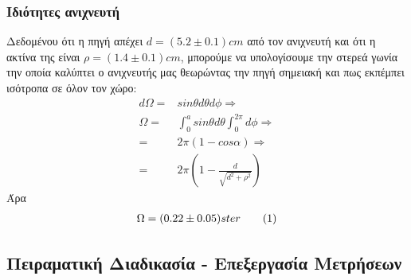\documentclass[a4paper]{article}
\newcommand\numberthis{\addtocounter{equation}{1}\tag{\theequation}}
\begin{document}
	\subsubsection*{Ιδιότητες ανιχνευτή}
	Δεδομένου ότι η πηγή απέχει $d=(5.2\pm 0.1) cm$ από τον ανιχνευτή και ότι η ακτίνα της είναι $\rho = (1.4\pm 0.1)cm$, μπορούμε να υπολογίσουμε την στερεά γωνία την οποία καλύπτει ο ανιχνευτής μας θεωρώντας την πηγή σημειακή και πως εκπέμπει ισότροπα σε όλον τον χώρο: 
		\begin{align*}
			d\Omega =& sin\theta d\theta d\phi \Rightarrow\\
			\Omega  =& \int_0^a  sin\theta d\theta \int_0^{2\pi} d\phi \Rightarrow\\
			        =& 2\pi (1-cos\alpha) \Rightarrow\\
			        =& 2\pi \left(1-\frac{d}{\sqrt{d^2+\rho^2}}\right)
		\end{align*}		 
 		Άρα \footnotemark
 		\vspace{-0.7cm}
 		\begin{align*}\label{eq4}
 			\Omega = (0.22 \pm 0.05) ster 	\numberthis
		\end{align*} 	
\subsection*{Πειραματική Διαδικασία - Επεξεργασία Μετρήσεων}
\end{document}
